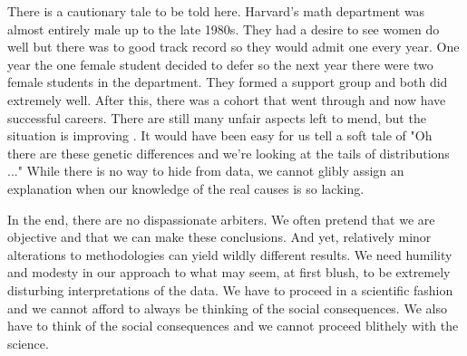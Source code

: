 There is a cautionary tale to be told here.
Harvard's math department was almost entirely male up to the late 1980s.
They had a desire to see women do well but there was to good track record so they would admit one every year.
One year the one female student decided to defer so the next year there were two female students in the department.
They formed a support group and both did extremely well.
After this, there was a cohort that went through and now have successful careers.
There are still many unfair aspects left to mend, but the situation is improving \cite{Jackson2004}.
It would have been easy for us tell a soft tale of "Oh there are these genetic differences and we're looking at the tails of distributions ..."
While there is no way to hide from data, we cannot glibly assign an explanation when our knowledge of the real causes is so lacking.

In the end, there are no dispassionate arbiters.
We often pretend that we are objective and that we can make these conclusions.
And yet, relatively minor alterations to methodologies can yield wildly different results.
We need humility and modesty in our approach to what may seem, at first blush, to be extremely disturbing interpretations of the data.
We have to proceed in a scientific fashion and we cannot afford to always be thinking of the social consequences.
We also have to think of the social consequences and we cannot proceed blithely with the science.
